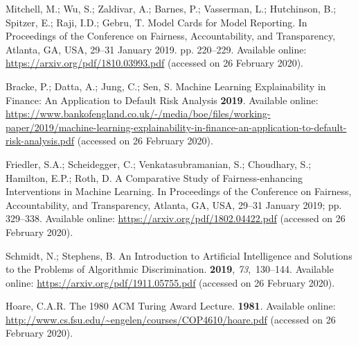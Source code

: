 \documentclass[information,article,accept,moreauthors,pdftex]{Definitions/mdpi}
\begin{document}
\begin{thebibliography}{999}
Mitchell, M.; Wu, S.; Zaldivar, A.; Barnes, P.; Vasserman, L.; Hutchinson, B.;
  Spitzer, E.; Raji, I.D.; Gebru, T.
\newblock Model {C}ards for {M}odel {R}eporting.
\newblock  In Proceedings of the Conference on Fairness, Accountability, and
  Transparency, Atlanta, GA, USA, 29--31 January 2019. pp. 220--229. %
\newblock Available online: \url{https://arxiv.org/pdf/1810.03993.pdf} (accessed on 26 February 2020).

Bracke, P.; Datta, A.; Jung, C.; Sen, S.
\newblock Machine {L}earning {E}xplainability in {F}inance: {A}n {A}pplication
  to {D}efault {R}isk {A}nalysis {\bf 2019}.
\newblock Available online: 
  \url{https://www.bankofengland.co.uk/-/media/boe/files/working-paper/2019/machine-learning-explainability-in-finance-an-application-to-default-risk-analysis.pdf} (accessed on 26 February 2020).

Friedler, S.A.; Scheidegger, C.; Venkatasubramanian, S.; Choudhary, S.;
  Hamilton, E.P.; Roth, D.
\newblock A {C}omparative {S}tudy of {F}airness-enhancing {I}nterventions in
  {M}achine {L}earning.
\newblock  In Proceedings of the Conference on Fairness, Accountability, and
  Transparency, Atlanta, GA, USA, 29--31 January 2019; pp. 329--338. 
\newblock Available online: \url{https://arxiv.org/pdf/1802.04422.pdf} (accessed on 26 February 2020).

Schmidt, N.; Stephens, B.
\newblock An {I}ntroduction to {A}rtificial {I}ntelligence and {S}olutions to
  the {P}roblems of {A}lgorithmic {D}iscrimination.
 {\bf 2019},
  {\em 73},~130--144.
\newblock Available online: \url{https://arxiv.org/pdf/1911.05755.pdf} (accessed on 26 February 2020).

Hoare, C.A.R.
\newblock The 1980 {A}{C}{M} {T}uring {A}ward {L}ecture.
 {\bf 1981}.
\newblock Available online: \url{http://www.cs.fsu.edu/~engelen/courses/COP4610/hoare.pdf}  (accessed on 26 February 2020).

\end{thebibliography}

\end{document}
